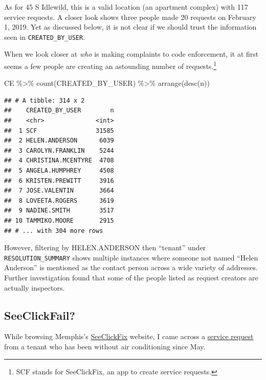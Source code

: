 \documentclass[
]{book}
\newenvironment{Shaded}{\begin{snugshade}}{\end{snugshade}}
\newcommand{\FunctionTok}[1]{\textcolor[rgb]{0.00,0.00,0.00}{#1}}
\newcommand{\NormalTok}[1]{#1}
\newcommand{\SpecialCharTok}[1]{\textcolor[rgb]{0.00,0.00,0.00}{#1}}
\begin{document}
As for 45 S Idlewild, this is a valid location (an apartment complex) with 117 service requests. A closer look shows three people made 20 requests on February 1, 2019. Yet as discussed below, it is not clear if we should trust the information seen in \texttt{CREATED\_BY\_USER}.

When we look closer at \emph{who} is making complaints to code enforcement, it at first seems a few people are creating an astounding number of requests.\footnote{SCF stands for SeeClickFix, an app to create service requests.}

\begin{Shaded}
\begin{Highlighting}[]
\NormalTok{CE }\SpecialCharTok{\%\textgreater{}\%} \FunctionTok{count}\NormalTok{(CREATED\_BY\_USER) }\SpecialCharTok{\%\textgreater{}\%} \FunctionTok{arrange}\NormalTok{(}\FunctionTok{desc}\NormalTok{(n))}
\end{Highlighting}
\end{Shaded}

\begin{verbatim}
## # A tibble: 314 x 2
##    CREATED_BY_USER        n
##    <chr>              <int>
##  1 SCF                31585
##  2 HELEN.ANDERSON      6039
##  3 CAROLYN.FRANKLIN    5244
##  4 CHRISTINA.MCENTYRE  4708
##  5 ANGELA.HUMPHREY     4508
##  6 KRISTEN.PREWITT     3916
##  7 JOSE.VALENTIN       3664
##  8 LOVEETA.ROGERS      3619
##  9 NADINE.SMITH        3517
## 10 TAMMIKO.MOORE       2915
## # ... with 304 more rows
\end{verbatim}

However, filtering by HELEN.ANDERSON then ``tenant'' under \texttt{RESOLUTION\_SUMMARY} shows multiple instances where someone not named ``Helen Anderson'' is mentioned as the contact person across a wide variety of addresses. Further investigation found that some of the people listed as request creators are actually inspectors.

\hypertarget{seeclickfail}{%
\subsection{SeeClickFail?}\label{seeclickfail}}

While browsing Memphis's \href{https://seeclickfix.com/web_portal/DaM5B2x33WeFNJ1zpUeDRvCB/issues/map?lat=35.14896833842707\&lng=-90.05163922905923\&max_lat=35.15402992416014\&max_lng=-90.04691720008852\&min_lat=35.143906437842766\&min_lng=-90.05635857582094\&zoom=17}{SeeClickFix} website, I came across a \href{https://seeclickfix.com/web_portal/DaM5B2x33WeFNJ1zpUeDRvCB/issues/10508076}{service request} from a tenant who has been without air conditioning since May.
\end{document}

